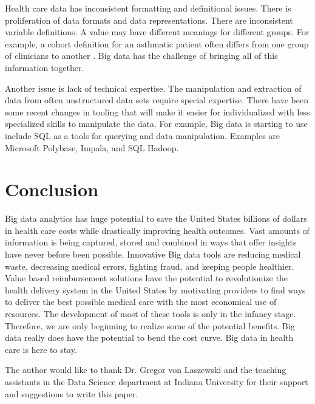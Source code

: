 \documentclass[sigconf]{acmart}
\begin{document}
Health care data has inconsistent formatting and definitional issues. There is proliferation of data formats and data representations. There are inconsistent variable definitions. A value may have different meanings for different groups. For example, a cohort definition for an asthmatic patient often differs from one group of clinicians to another \cite{www-google-reas}. Big data has the challenge of bringing all of this information together.  

Another issue is lack of technical expertise. The manipulation and extraction of data from often unstructured data sets require special expertise. There have been some recent changes in tooling that will make it easier for individualized with less specialized skills to manipulate the data. For example, Big data is starting to use include SQL as a tools for querying and data manipulation. Examples are Microsoft Polybase, Impala, and SQL Hadoop.  
 
 

\section{Conclusion}
Big data analytics has huge potential to save the United States billions of dollars in health care costs while drastically improving health outcomes.  Vast amounts of information is being captured, stored and combined in ways that offer insights have never before been possible.  Innovative Big data tools are reducing medical waste, decreasing medical errors, fighting fraud, and keeping people healthier. Value based reimbursement solutions have the potential to revolutionize the health delivery system in the United States by motivating providers to find ways to deliver the best possible medical care with the most economical use of resources.  The development of most of these tools is only in the infancy stage. Therefore, we are only beginning to realize some of the potential benefits. Big data really does have the potential to bend the cost curve. Big data in health care is here to stay.  







\begin{acks}

  The author would like to thank Dr. Gregor von Laszewski and the teaching assistants in the Data Science department at Indiana University for their support and suggestions to write this paper.

\end{acks}




 
\end{document}
